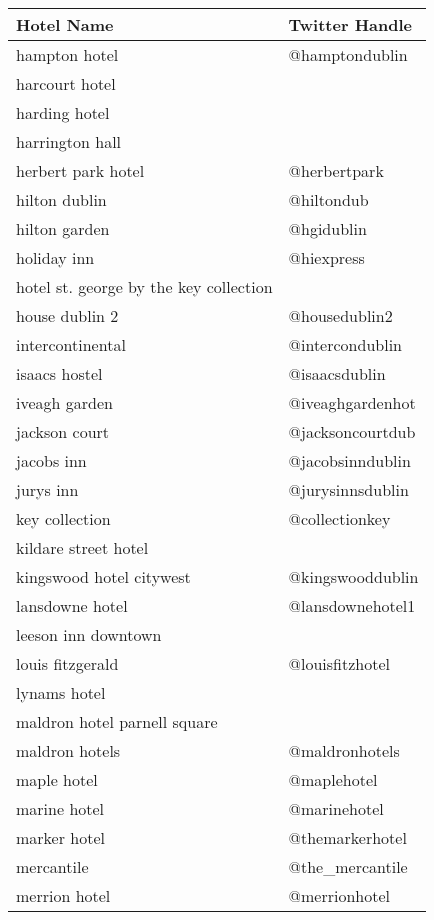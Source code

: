 \begin{table}[h!]
\begin{tabular}{|p{7cm}|p{5cm}|}
\hline
\rowcolor[HTML]{EFEFEF}
\textbf{Hotel Name} & \textbf{Twitter Handle} \\ \hline
hampton hotel & @hamptondublin \\ \hline
harcourt hotel &  \\ \hline
harding hotel &  \\ \hline
harrington hall &  \\ \hline
herbert park hotel & @herbertpark \\ \hline
hilton dublin & @hiltondub \\ \hline
hilton garden & @hgidublin \\ \hline
holiday inn & @hiexpress \\ \hline
hotel st. george by the key collection &  \\ \hline
house dublin 2 & @housedublin2 \\ \hline
intercontinental & @intercondublin \\ \hline
isaacs hostel & @isaacsdublin \\ \hline
iveagh garden & @iveaghgardenhot \\ \hline
jackson court & @jacksoncourtdub \\ \hline
jacobs inn & @jacobsinndublin \\ \hline
jurys inn & @jurysinnsdublin \\ \hline
key collection & @collectionkey \\ \hline
kildare street hotel &  \\ \hline
kingswood hotel citywest & @kingswooddublin \\ \hline
lansdowne hotel & @lansdownehotel1 \\ \hline
leeson inn downtown &  \\ \hline
louis fitzgerald & @louisfitzhotel \\ \hline
lynams hotel &  \\ \hline
maldron hotel parnell square &  \\ \hline
maldron hotels & @maldronhotels \\ \hline
maple hotel & @maplehotel \\ \hline
marine hotel & @marinehotel \\ \hline
marker hotel & @themarkerhotel \\ \hline
mercantile & @the\_mercantile \\ \hline
merrion hotel & @merrionhotel \\ \hline

\end{tabular}
\end{table}
